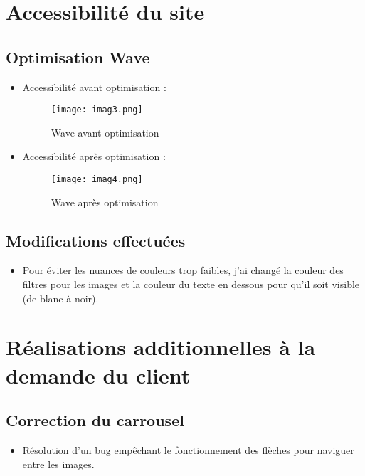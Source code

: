 \newpage
\section{Accessibilité du site}
\subsection{Optimisation Wave}
\begin{itemize}
    \item Accessibilité avant optimisation :
    \begin{figure}[h!] %
    \centering %
    \texttt{[image: imag3.png]} %
    \caption{ Wave avant optimisation} %
    \label{imag3.png} %
    \end{figure}
    \newpage
    \item Accessibilité après optimisation :
    \begin{figure}[h!] %
    \centering %
    \texttt{[image: imag4.png]} %
    \caption{ Wave après optimisation} %
    \label{imag3.png} %
    \end{figure}
\end{itemize}
\subsection{Modifications effectuées}
\begin{itemize}
    \item Pour éviter les nuances de couleurs trop faibles, j’ai changé la couleur des filtres pour les images et la couleur du texte en dessous pour qu’il soit visible (de blanc à noir).
\end{itemize}

\newpage
\section{Réalisations additionnelles à la demande du client}
\subsection{Correction du carrousel}
\begin{itemize}
    \item Résolution d'un bug empêchant le fonctionnement des flèches pour naviguer entre les images.
\end{itemize}

